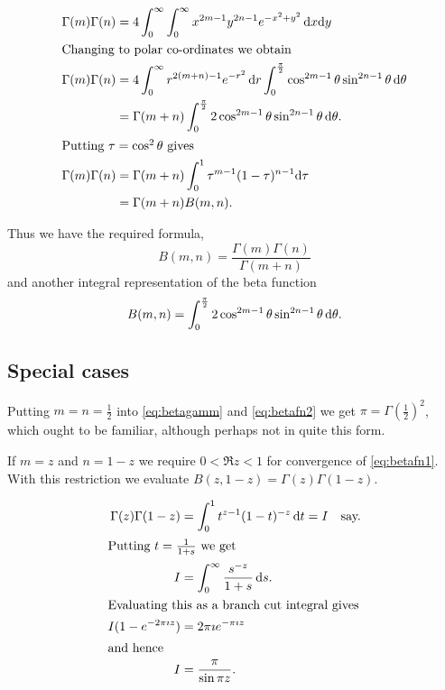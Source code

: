 \documentclass{notes}
\theoremstyle{plain}
\begin{document}
\begin{align*}
\Gamma(m) \Gamma(n) &= 4 \int_0^\infty \int_0^\infty x^{2 m - 1}
y^{2 n - 1} e^{-x^2 + y^2}\,\mathrm{d} x \mathrm{d} y \\
\intertext{Changing to polar co-ordinates we obtain}
\Gamma(m) \Gamma(n)
&= 4 \int_0^\infty r^{2(m+n)-1} e^{-r^2}\, \mathrm{d} r \int_0^{\frac{\pi}{2}}
\cos^{2m - 1} \theta \sin^{2 n - 1} \theta\, \mathrm{d}\theta \\
&= \Gamma(m+n) \int_0^{\frac{\pi}{2}} 2 \cos^{2m - 1} \theta \sin^{2 n - 1}
\theta\, \mathrm{d}\theta. \\
\intertext{Putting $\tau = \cos^2 \theta$ gives}
\Gamma(m) \Gamma(n)
&= \Gamma(m+n) \int_0^1 \tau^{m-1} (1-\tau)^{n-1} \mathrm{d}\tau \\
&= \Gamma(m+n) B(m,n).
\end{align*}

Thus we have the required formula,
\begin{equation}\label{eq:betagamm}
B(m,n) = \frac{\Gamma(m) \Gamma(n)}{\Gamma(m+n)}
\end{equation}
and another integral representation of the beta function
\begin{equation}\label{eq:betafn2}
B(m,n) = \int_0^{\frac{\pi}{2}} 2 \cos^{2m - 1} \theta \sin^{2 n - 1}
\theta\, \mathrm{d}\theta.
\end{equation}

\subsection*{Special cases}

Putting $m=n=\frac{1}{2}$ into \eqref{eq:betagamm} and \eqref{eq:betafn2}
we get $\pi = \Gamma(\frac{1}{2})^2$,
which ought to be familiar, although perhaps not in quite this form.

If $m = z$ and $n = 1-z$ we require $0 < \Re z < 1$ for convergence
of \eqref{eq:betafn1}.  With this restriction we evaluate $B(z,1-z)
= \Gamma(z) \Gamma(1-z)$.

\begin{align*}
\Gamma(z) \Gamma(1-z) &= \int_0^1 t^{z - 1} (1-t)^{-z}\, \mathrm{d} t = I
\quad \text{say.}\\
\intertext{Putting $t=\frac{1}{1+s}$ we get}
I &= \int_0^\infty \frac{s^{-z}}{1+s}\, \mathrm{d} s.\\
\intertext{Evaluating this as a branch cut integral gives}
I ( 1- e^{-2 \pi \imath z} ) &= 2 \pi \imath e^{- \pi \imath z}\\
\intertext{and hence}
I &= \frac{\pi}{\sin \pi z}.
\end{align*}
\end{document}

